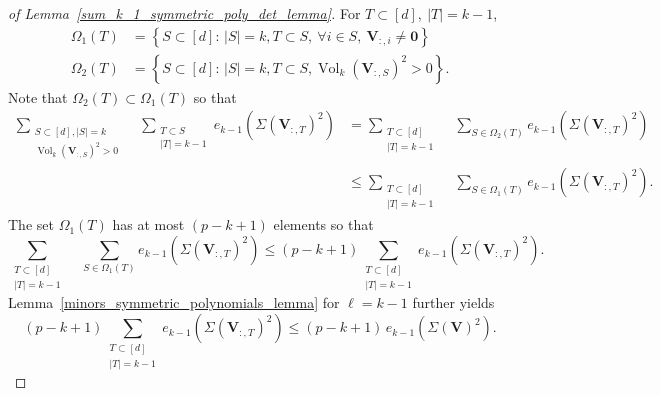 \documentclass[twoside,11pt]{book}
\numberwithin{theorem}{chapter}
\numberwithin{definition}{chapter}
\numberwithin{proposition}{chapter}
\numberwithin{corollary}{chapter}
\numberwithin{example}{chapter}
\numberwithin{lemma}{chapter}
\numberwithin{assumption}{chapter}
\DeclareMathOperator{\Vol}{Vol}
\begin{document}
\begin{proof}[of Lemma~\ref{sum_k_1_symmetric_poly_det_lemma}]
For $T \subset [d], \: |T| = k-1$,
\begin{align*}
    \Omega_{1}(T) &= \left\{ S \subset[d]:\, |S| = k, T \subset S,\ \forall i \in S ,\ \bm{V}_{:,i} \neq \bm{0} \right\}\\
    \Omega_{2}(T) &= \left\{ S \subset[d] :\, |S| = k, T \subset S, \Vol_{k}(\bm{V}_{:,S})^{2} >0   \right\}.
\end{align*}
Note that $\Omega_{2}(T) \subset \Omega_{1}(T)$ so that
\begin{align*}
        \sum\limits_{\substack{S \subset [d], |S| = k\\\Vol_{k}(\bm{V}_{:,S})^{2} >0}} \quad \sum\limits_{\substack{T \subset S\\ |T| = k-1}} e_{k-1}(\Sigma(\bm{V}_{:,T})^{2})
        & = \sum\limits_{\substack{T \subset [d]\\ |T| = k-1}} \quad \sum\limits_{S \in \Omega_{2}(T)} e_{k-1}(\Sigma(\bm{V}_{:,T})^{2}) \\
        & \leq \sum\limits_{\substack{T \subset [d]\\ |T| = k-1}} \quad \sum\limits_{S \in \Omega_{1}(T)} e_{k-1}(\Sigma(\bm{V}_{:,T})^{2}).
\end{align*}
The set $\Omega_{1}(T)$ has at most $(p-k+1)$ elements so that
\begin{equation}
\sum\limits_{\substack{T \subset [d]\\ |T| = k-1}} \quad \sum\limits_{S \in \Omega_{1}(T)} e_{k-1}(\Sigma(\bm{V}_{:,T})^{2}) \leq (p-k+1)\sum\limits_{\substack{T \subset [d]\\ |T| = k-1}}  e_{k-1}(\Sigma(\bm{V}_{:,T})^{2}).
\end{equation}
Lemma~\ref{minors_symmetric_polynomials_lemma} for $\ell=k-1$ further yields
\begin{equation}
(p-k+1)\sum\limits_{\substack{T \subset [d]\\ |T| = k-1}}  e_{k-1}(\Sigma(\bm{V}_{:,T})^{2}) \leq (p-k+1)\,e_{k-1}(\Sigma(\bm{V})^{2}).
\end{equation}
\end{proof}

\end{document}
